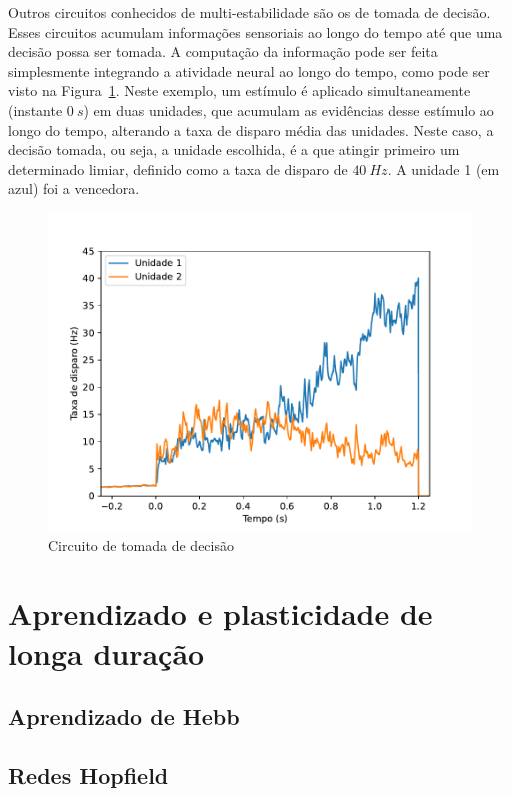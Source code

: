 Outros circuitos conhecidos de multi-estabilidade são os de tomada de decisão. Esses circuitos acumulam informações sensoriais ao longo do tempo até que uma decisão possa ser tomada. A computação da informação pode ser feita simplesmente integrando a atividade neural ao longo do tempo,
como pode ser visto na Figura~\ref{fig:tomadadecisao}. Neste exemplo, um estímulo é aplicado simultaneamente (instante $0\ s$) em duas unidades, que acumulam as evidências desse estímulo ao longo do tempo, alterando a taxa de disparo média das unidades. Neste caso, a decisão tomada, ou seja, a unidade escolhida, é a que atingir primeiro um determinado limiar, definido como a taxa de disparo de $40\ Hz$. A unidade 1 (em azul) foi a vencedora.
\begin{figure}[tb]
	\centering
	\caption[Circuito de tomada de decisão]{Circuito de tomada de decisão}
	\label{fig:tomadadecisao}
	\includegraphics[width=0.7\linewidth]{figs/tomada_decisao}
\end{figure}


\section{Aprendizado e plasticidade de longa duração}\label{sec:aprendizado}

\subsection{Aprendizado de Hebb}

\subsection{Redes Hopfield}


